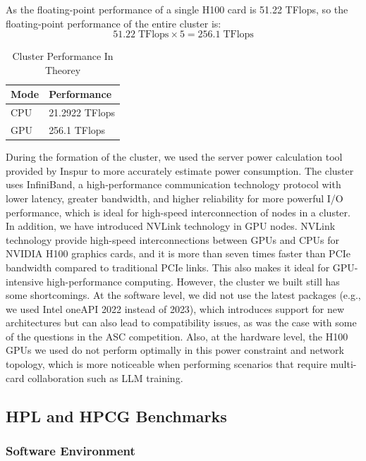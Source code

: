 \documentclass[a4paper,12pt]{article}
\begin{document}
As the floating-point performance of a single H100 card is 51.22 TFlops, so the floating-point performance of the entire cluster is:
\begin{equation*}
51.22\;\text{TFlops} \times 5 = 256.1 \;\text{TFlops}
\end{equation*}

\begin{table}[H]
\centering
\vspace{0.5cm}
\begin{tabular}{ll}
\toprule
Mode & Performance \\
\midrule
CPU & 21.2922 TFlops \\
GPU & 256.1 TFlops \\
\bottomrule
\end{tabular}
\caption{Cluster Performance In Theorey}
\end{table}

During the formation of the cluster, we used the server power calculation tool provided by Inspur to more accurately estimate power consumption. The cluster uses InfiniBand, a high-performance communication technology protocol with lower latency, greater bandwidth, and higher reliability for more powerful I/O performance, which is ideal for high-speed interconnection of nodes in a cluster. In addition, we have introduced NVLink technology in GPU nodes. NVLink technology provide high-speed interconnections between GPUs and CPUs for NVIDIA H100 graphics cards, and it is more than seven times faster than PCIe bandwidth compared to traditional PCIe links. This also makes it ideal for GPU-intensive high-performance computing. However, the cluster we built still has some shortcomings. At the software level, we did not use the latest packages (e.g., we used Intel oneAPI 2022 instead of 2023), which introduces support for new architectures but can also lead to compatibility issues, as was the case with some of the questions in the ASC competition. Also, at the hardware level, the H100 GPUs we used do not perform optimally in this power constraint and network topology, which is more noticeable when performing scenarios that require multi-card collaboration such as LLM training.

\subsection{HPL and HPCG Benchmarks}

\subsubsection{Software Environment}
\end{document}

